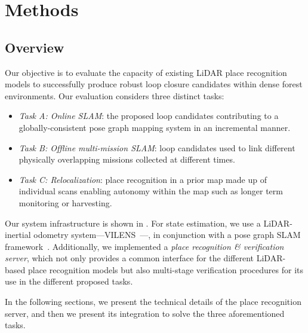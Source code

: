 \chapter{Methods}
\label{ch:methods}

\section{Overview}
\label{sec:overview}
Our objective is to evaluate the capacity of existing LiDAR place recognition models to successfully produce robust loop closure candidates within dense forest environments. Our evaluation considers three distinct tasks: 
\begin{itemize}
  \listparindent=-20pt
  \item \emph{Task A: Online SLAM}: the proposed loop candidates contributing to a globally-consistent pose graph mapping system in an incremental manner.
  \item \emph{Task B: Offline multi-mission SLAM}: loop candidates used to link different physically overlapping missions collected at different times.
  \item \emph{Task C: Relocalization}: place recognition in a prior map made up of individual scans enabling autonomy within the map such as longer term monitoring or harvesting.
\end{itemize}

Our system infrastructure is shown in . For state estimation, we use a LiDAR-inertial odometry system---VILENS~\cite{wisth2023tro}---, in conjunction with a pose graph SLAM framework~\cite{proudman2022ras}. Additionally, we implemented a \emph{place recognition \& verification server}, which not only provides a common interface for the different LiDAR-based place recognition models but also multi-stage verification procedures for its use in the different proposed tasks.

In the following sections, we present the technical details of the place recognition server, and then we present its integration to solve the three aforementioned tasks.


